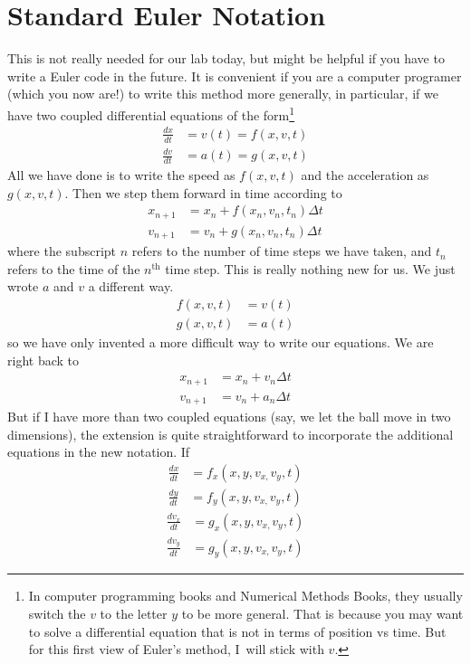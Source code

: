 \documentclass{book}
\begin{document}
\section{Standard Euler Notation}

This is not really needed for our lab today, but might be helpful if you have
to write a Euler code in the future. It is convenient if you are a computer
programer (which you now are!) to write this method more generally, in
particular, if we have two coupled differential equations of the
form\footnote{In computer programming books and Numerical Methods Books, they
usually switch the $v$ to the letter $y$ to be more general. That is because
you may want to solve a differential equation that is not in terms of position
vs time. But for this first view of Euler's method, I\ will stick with $v.$}
\begin{align*}
\frac{dx}{dt}  & =v\left(  t\right)  =f(x,v,t)\\
\frac{dv}{dt}  & =a\left(  t\right)  =g(x,v,t)
\end{align*}
All we have done is to write the speed as $f(x,v,t)$ and the acceleration as
$g(x,v,t).$ Then we step them forward in time according to \begin{align*}
x_{n+1}  & =x_{n}+f(x_{n},v_{n},t_{n})\Delta t\\
v_{n+1}  & =v_{n}+g(x_{n},v_{n},t_{n})\Delta t
\end{align*}
where the subscript $n$ refers to the number of time steps we have taken, and
$t_{n}$ refers to the time of the $n^{\text{th}}$ time step. This is really
nothing new for us. We just wrote $a$ and $v$ a different way.
\begin{align*}
f(x,v,t)  & =v\left(  t\right) \\
g(x,v,t)  & =a\left(  t\right)
\end{align*}
so we have only invented a more difficult way to write our equations. We are
right back to
\begin{align*}
x_{n+1}  & =x_{n}+v_{n}\Delta t\\
v_{n+1}  & =v_{n}+a_{n}\Delta t
\end{align*}
But if I have more than two coupled equations (say, we let the ball move in
two dimensions), the extension is quite straightforward to incorporate the
additional equations in the new notation. If
\begin{align*}
\frac{dx}{dt}  & =f_{x}(x,y,v_{x,}v_{y},t)\\
\frac{dy}{dt}  & =f_{y}(x,y,v_{x,}v_{y},t)
\end{align*} \begin{align*}
\frac{dv_{x}}{dt}  & =g_{x}(x,y,v_{x,}v_{y},t)\\
\frac{dv_{y}}{dt}  & =g_{y}(x,y,v_{x,}v_{y},t)
\end{align*}
\end{document}
